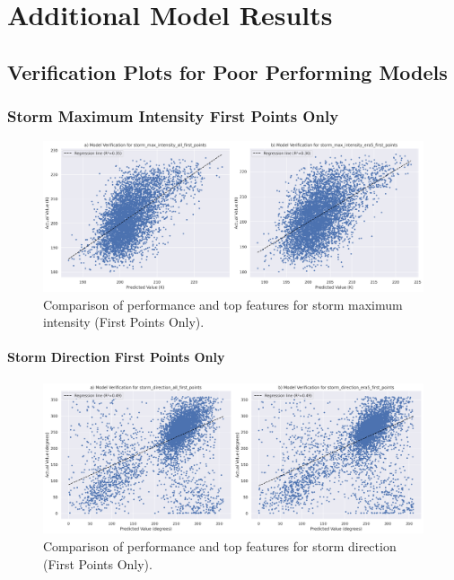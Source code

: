 \chapter{Additional Model Results}
\label{appn:modelresults}

\section{Verification Plots for Poor Performing Models}

\subsection{Storm Maximum Intensity First Points Only}

\begin{figure}[h]
    \centering
    \includegraphics[width=\textwidth]{../figures/generated/experiments/storm_max_intensity_first_points/storm_max_intensity_first_points_summary.png}
    \caption{Comparison of performance and top features for storm maximum intensity (First Points Only).}
    \label{fig:storm_max_intensity_first_points_summary}
\end{figure}

\subsubsection{Storm Direction First Points Only}

\begin{figure}[h]
    \centering
    \includegraphics[width=\textwidth]{../figures/generated/experiments/storm_direction_first_points/storm_direction_first_points_summary.png}
    \caption{Comparison of performance and top features for storm direction (First Points Only).}
    \label{fig:storm_direction_first_points_summary}
\end{figure}

